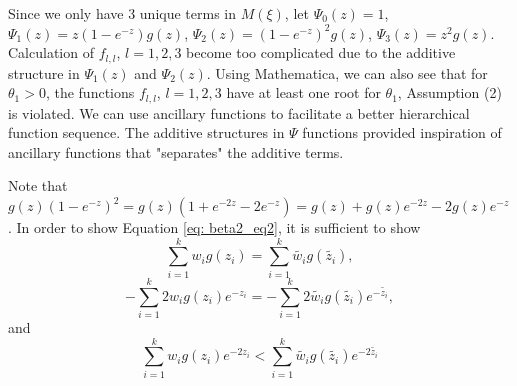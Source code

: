 \documentclass[11pt]{amsart}
\theoremstyle{definition}
\theoremstyle{remark}
\numberwithin{equation}{section}
\begin{document}
Since we only have 3 unique terms in $M(\xi)$, let $\Psi_0(z) = 1$, $\Psi_1(z) = z(1-e^{-z})g(z)$, $\Psi_2(z) = (1-e^{-z})^2g(z)$, $\Psi_3(z) = z^2g(z)$. Calculation of $f_{l,l}$, $l=1,2,3$ become too complicated due to the additive structure in $\Psi_1(z)$ and $\Psi_2(z)$. Using Mathematica, we can also see that for $\theta_1>0$, the functions $f_{l,l}$, $l=1,2,3$ have at least one root for $\theta_1$, Assumption (2) is violated. We can use ancillary functions to facilitate a better hierarchical function sequence. The additive structures in $\Psi$ functions provided inspiration of ancillary functions that "separates" the additive terms. 

Note that $g(z)(1-e^{-z})^2 = g(z)(1+e^{-2z}-2e^{-z}) = g(z)+g(z)e^{-2z}-2g(z)e^{-z}$. In order to show Equation \eqref{eq: beta2_eq2}, it is sufficient to show 
\begin{equation}\label{eq: beta_eq21}
\sum_{i=1}^{k} w_i g(z_i) = \sum_{i=1}^{k} \tilde{w_i}  g(\tilde{z_i}),\end{equation}
\begin{equation}\label{eq: beta_eq22}
-\sum_{i=1}^{k}2 w_i  g(z_i)e^{-z_i} = -\sum_{i=1}^{k}2 \tilde{w_i} g(\tilde{z_i}) e^{-\tilde{z_i}},
\end{equation}
and
\begin{equation}\label{eq: beta_eq23}
\sum_{i=1}^{k} w_i g(z_i)e^{-2z_i} < \sum_{i=1}^{k} \tilde{w_i}g(\tilde{z_i})e^{-2\tilde{z_i}}
\end{equation}
\end{document}
